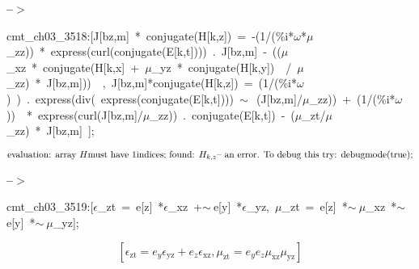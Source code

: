 \documentclass[fleqn]{article}
\begin{document}
\noindent
\begin{minipage}[t]{4.000000em}\color{red}\bfseries
 --\ensuremath{\ensuremath{>}}	
\end{minipage}
\begin{minipage}[t]{\textwidth}\color{blue}
cmt\_ch03\_3518:[J[bz,m]\ *\ conjugate(H[k,z])\ =\ -(1/(\%i*\ensuremath{\omega}*\ensuremath{\mu}\_zz))\ *\ express(curl(conjugate(E[k,t])))\ .\ J[bz,m]\ -\ ((\ensuremath{\mu}\_xz\ *\ conjugate(H[k,x]\ +\ \ensuremath{\mu}\_yz\ *\ conjugate(H[k,y])\ \ /\ \ensuremath{\mu}\_zz)\ *\ J[bz,m]))\ \ ,\ J[bz,m]*conjugate(H[k,z])\ =\ (1/(\%i*\ensuremath{\omega})\ )\ .\ express(div(\ express(conjugate(E[k,t])))\ \ensuremath{\sim\ }\ (J[bz,m]/\ensuremath{\mu}\_zz))\ +\ (1/(\%i*\ensuremath{\omega}))\ \ *\ express(curl(J[bz,m]/\ensuremath{\mu}\_zz))\ .\ conjugate(E[k,t])\ -\ (\ensuremath{\mu}\_zt/\ensuremath{\mu}\_zz)\ *\ J[bz,m]\ ];
\end{minipage}
\[\displaystyle \mbox{}\\\mbox{%
evaluation: array }H\mbox{%
 must have }1\mbox{%
 indices; found: }{H_{k,z}}\mbox{%
 -- an error. To debug this try: debugmode(true);}\mbox{}
\]


\noindent
\begin{minipage}[t]{4.000000em}\color{red}\bfseries
 --\ensuremath{\ensuremath{>}}	
\end{minipage}
\begin{minipage}[t]{\textwidth}\color{blue}
cmt\_ch03\_3519:[\ensuremath{\epsilon}\_zt\ =\ e[z]\ *\ensuremath{\epsilon}\_xz\ +\ensuremath{\sim\ }e[y]\ *\ensuremath{\epsilon}\_yz,\ \ensuremath{\mu}\_zt\ =\ e[z]\ *\ensuremath{\sim\ }\ensuremath{\mu}\_xz\ *\ensuremath{\sim\ }e[y]\ *\ensuremath{\sim\ }\ensuremath{\mu}\_yz];
\end{minipage}
\[\displaystyle \tag{cmt\_ ch03\_ 3519} 
\left[ {{\epsilon }_{\ensuremath{\mathrm{zt}}}}={e_y} {{\epsilon }_{\ensuremath{\mathrm{yz}}}}+{e_z} {{\epsilon }_{\ensuremath{\mathrm{xz}}}}\operatorname{,}{{\mu }_{\ensuremath{\mathrm{zt}}}}={e_y} {e_z} {{\mu }_{\ensuremath{\mathrm{xz}}}} {{\mu }_{\ensuremath{\mathrm{yz}}}}\right] \mbox{}
\]
\end{document}
